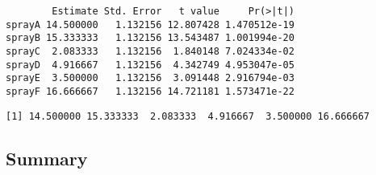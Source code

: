 \documentclass[12pt,openright,oneside,a4paper,chapter=TITLE,section=TITLE,subsection=Title,english,french,spanish,portugues,sumario=tradicional]{04-class-files/abntex2}
\newenvironment{Shaded}{\begin{snugshade}}{\end{snugshade}}
\newcommand{\DataTypeTok}[1]{\textcolor[rgb]{0.13,0.29,0.53}{#1}}
\newcommand{\DecValTok}[1]{\textcolor[rgb]{0.00,0.00,0.81}{#1}}
\newcommand{\KeywordTok}[1]{\textcolor[rgb]{0.13,0.29,0.53}{\textbf{#1}}}
\newcommand{\NormalTok}[1]{#1}
\newcommand{\OperatorTok}[1]{\textcolor[rgb]{0.81,0.36,0.00}{\textbf{#1}}}
\newcommand{\StringTok}[1]{\textcolor[rgb]{0.31,0.60,0.02}{#1}}
\begin{document}
\begin{Shaded}
\end{Shaded}

\begin{verbatim}
        Estimate Std. Error   t value     Pr(>|t|)
sprayA 14.500000   1.132156 12.807428 1.470512e-19
sprayB 15.333333   1.132156 13.543487 1.001994e-20
sprayC  2.083333   1.132156  1.840148 7.024334e-02
sprayD  4.916667   1.132156  4.342749 4.953047e-05
sprayE  3.500000   1.132156  3.091448 2.916794e-03
sprayF 16.666667   1.132156 14.721181 1.573471e-22
\end{verbatim}

\begin{Shaded}
\end{Shaded}

\begin{verbatim}
[1] 14.500000 15.333333  2.083333  4.916667  3.500000 16.666667
\end{verbatim}

\hypertarget{summary}{%
\subsection{Summary}\label{summary}}
\end{document}
